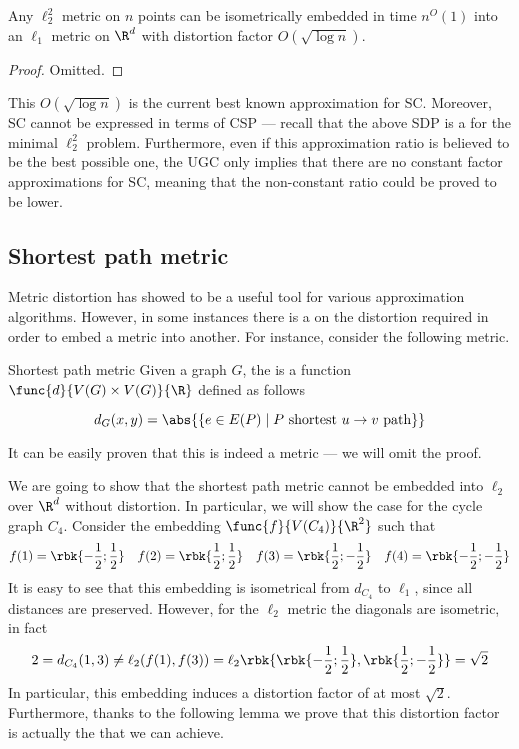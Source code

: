 \documentclass[a4paper, 12pt]{report}
\begin{document}
    \begin{framedprop}{}
        Any $\ell_2^2$ metric on $n$ points can be isometrically embedded in time $n^O(1)$ into an $\ell_1$ metric on $\R^d$ with distortion factor $O(\sqrt{\log n})$.
    \end{framedprop}

    \begin{proof}
        Omitted.
    \end{proof}

    This $O(\sqrt{\log n})$ is the current best known approximation for SC. Moreover, SC cannot be expressed in terms of CSP --- recall that the above SDP is a  for the minimal $\ell_2^2$ problem. Furthermore, even if this approximation ratio is believed to be the best possible one, the UGC only implies that there are no constant factor approximations for SC, meaning that the non-constant ratio could be proved to be lower.

    \subsection{Shortest path metric}

    Metric distortion has showed to be a useful tool for various approximation algorithms. However, in some instances there is a  on the distortion required in order to embed a metric into another. For instance, consider the following metric.

    \begin{frameddefn}{Shortest path metric}
        Given a graph $G$, the  is a function $\func{d}{V(G) \times V(G)}{\R}$ defined as follows

        $$d_G(x, y) = \abs{\{e \in E(P) \mid P \ \mathrm{shortest} \ u \to v \ \mathrm{path}\}}$$
    \end{frameddefn}

    It can be easily proven that this is indeed a metric --- we will omit the proof.

    We are going to show that the shortest path metric cannot be embedded into $\ell_2$ over $\R^d$ without distortion. In particular, we will show the case for the cycle graph $C_4$. Consider the embedding $\func{f}{V(C_4)}{\R^2}$ such that $$f(1) = \rbk{-\dfrac{1}{2}; \dfrac{1}{2}} \quad f(2) = \rbk{\dfrac{1}{2}; \dfrac{1}{2}} \quad f(3) =\rbk{\dfrac{1}{2}; -\dfrac{1}{2}} \quad f(4) = \rbk{-\dfrac{1}{2}; -\dfrac{1}{2}}$$ It is easy to see that this embedding is isometrical from $d_{C_4}$ to $\ell_1$, since all distances are preserved. However, for the $\ell_2$ metric the diagonals are  isometric, in fact $$2 = d_{C_4}(1, 3) \neq \ell_2(f(1), f(3)) = \ell_2 \rbk{\rbk{-\dfrac{1}{2}; \dfrac{1}{2}},\rbk{\dfrac{1}{2}; -\dfrac{1}{2}}} = \sqrt 2$$ In particular, this embedding induces a distortion factor of at most $\sqrt 2$. Furthermore, thanks to the following lemma we prove that this distortion factor is actually the  that we can achieve.
\end{document}
